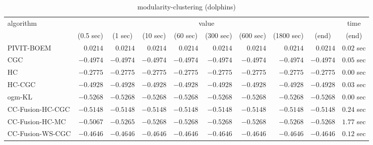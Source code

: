 \begin{table}[H]
\scriptsize
\centering
\caption{modularity-clustering (dolphins)}
\label{tab:anytimetable-modularity-clustering-dolphins}
\begin{tabular}{lrrrrrrrrr}
\toprule
           algorithm &                                   \multicolumn{8}{c}{value} & \multicolumn{1}{c}{time}   \\  
\cmidrule(lr){2-9}\cmidrule(lr){10-10}   
                     & \multicolumn{1}{c}{(0.5 sec)} & \multicolumn{1}{c}{(1 sec)} & \multicolumn{1}{c}{(10 sec)} & \multicolumn{1}{c}{(60 sec)} & \multicolumn{1}{c}{(300 sec)} & \multicolumn{1}{c}{(600 sec)} & \multicolumn{1}{c}{(1800 sec)} & \multicolumn{1}{c}{(end)} & \multicolumn{1}{c}{(end)}   \\ \midrule 
          PIVIT-BOEM & $       0.0214$ & $       0.0214$ & $       0.0214$ & $       0.0214$ & $       0.0214$ & $       0.0214$ & $       0.0214$ & $       0.0214$ & $         0.02$ sec   \\ 
                 CGC & $      -0.4974$ & $      -0.4974$ & $      -0.4974$ & $      -0.4974$ & $      -0.4974$ & $      -0.4974$ & $      -0.4974$ & $      -0.4974$ & $         0.05$ sec   \\ 
                  HC & $      -0.2775$ & $      -0.2775$ & $      -0.2775$ & $      -0.2775$ & $      -0.2775$ & $      -0.2775$ & $      -0.2775$ & $      -0.2775$ & $         0.00$ sec   \\ 
              HC-CGC & $      -0.4928$ & $      -0.4928$ & $      -0.4928$ & $      -0.4928$ & $      -0.4928$ & $      -0.4928$ & $      -0.4928$ & $      -0.4928$ & $         0.03$ sec   \\ 
              ogm-KL & $      -0.5268$ & $      -0.5268$ & $      -0.5268$ & $      -0.5268$ & $      -0.5268$ & $      -0.5268$ & $      -0.5268$ & $      -0.5268$ & $         0.00$ sec   \\ 
    CC-Fusion-HC-CGC & $      -0.5148$ & $      -0.5148$ & $      -0.5148$ & $      -0.5148$ & $      -0.5148$ & $      -0.5148$ & $      -0.5148$ & $      -0.5148$ & $         0.24$ sec   \\ 
     CC-Fusion-HC-MC & $      -0.5067$ & $      -0.5265$ & $      -0.5268$ & $      -0.5268$ & $      -0.5268$ & $      -0.5268$ & $      -0.5268$ & $      -0.5268$ & $         1.77$ sec   \\ 
    CC-Fusion-WS-CGC & $      -0.4646$ & $      -0.4646$ & $      -0.4646$ & $      -0.4646$ & $      -0.4646$ & $      -0.4646$ & $      -0.4646$ & $      -0.4646$ & $         0.12$ sec   \\ 

\end{tabular}
\end{table}
